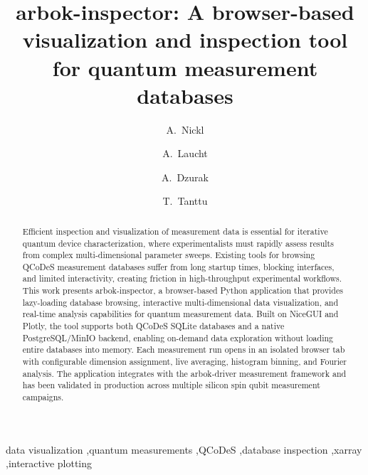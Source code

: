 \documentclass[preprint,12pt]{elsarticle}
\begin{document}
\begin{frontmatter}

\title{arbok-inspector: A browser-based visualization and inspection tool for quantum measurement databases}

\author[unsw]{A.~Nickl}

\author[unsw,diraq]{A.~Laucht}
\author[unsw,diraq]{A.~Dzurak}
\author[unsw,diraq]{T.~Tanttu}



\begin{abstract}
Efficient inspection and visualization of measurement data is essential for iterative quantum device characterization, where experimentalists must rapidly assess results from complex multi-dimensional parameter sweeps.
Existing tools for browsing QCoDeS measurement databases suffer from long startup times, blocking interfaces, and limited interactivity, creating friction in high-throughput experimental workflows.
This work presents arbok-inspector, a browser-based Python application that provides lazy-loading database browsing, interactive multi-dimensional data visualization, and real-time analysis capabilities for quantum measurement data.
Built on NiceGUI and Plotly, the tool supports both QCoDeS SQLite databases and a native PostgreSQL/MinIO backend, enabling on-demand data exploration without loading entire databases into memory.
Each measurement run opens in an isolated browser tab with configurable dimension assignment, live averaging, histogram binning, and Fourier analysis.
The application integrates with the arbok-driver measurement framework and has been validated in production across multiple silicon spin qubit measurement campaigns.
\end{abstract}

\begin{keyword}
data visualization \sep quantum measurements \sep QCoDeS \sep database inspection \sep xarray \sep interactive plotting
\end{keyword}

\end{frontmatter}
\end{document}
